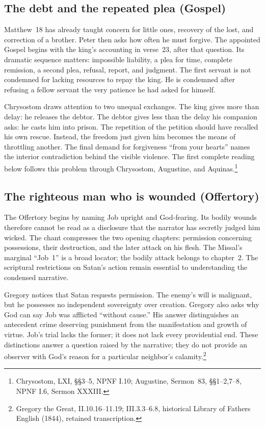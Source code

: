 \subsection{The debt and the repeated plea (Gospel)}
Matthew~18 has already taught concern for little ones, recovery of the
lost, and correction of a brother. Peter then asks how often he must
forgive. The appointed Gospel begins with the king's accounting in
verse~23, after that question. Its dramatic sequence matters: impossible
liability, a plea for time, complete remission, a second plea, refusal,
report, and judgment. The first servant is not condemned for lacking
resources to repay the king. He is condemned after refusing a fellow
servant the very patience he had asked for himself.

Chrysostom draws attention to two unequal exchanges. The king gives more
than delay: he releases the debtor. The debtor gives less than the delay
his companion asks: he casts him into prison. The repetition of the
petition should have recalled his own rescue. Instead, the freedom just
given him becomes the means of throttling another. The final demand for
forgiveness ``from your hearts'' names the interior contradiction behind
the visible violence. The first complete reading below follows this
problem through Chrysostom, Augustine, and Aquinas.\footnote{Chrysostom,
 LXI, \S\S3--5, NPNF I.10; Augustine,
Sermon~83, \S\S1--2,7--8, NPNF I.6, Sermon XXXIII.}

\subsection{The righteous man who is wounded (Offertory)}
The Offertory begins by naming Job upright and God-fearing. Its bodily
wounds therefore cannot be read as a disclosure that the narrator has
secretly judged him wicked. The chant compresses the two opening chapters:
permission concerning possessions, their destruction, and the later
attack on his flesh. The Missal's marginal ``Job~1'' is a broad locator;
the bodily attack belongs to chapter~2. The scriptural restrictions on
Satan's action remain essential to understanding the condensed narrative.

Gregory notices that Satan requests permission. The enemy's will is
malignant, but he possesses no independent sovereignty over creation.
Gregory also asks why God can say Job was afflicted ``without cause.''
His answer distinguishes an antecedent crime deserving punishment from
the manifestation and growth of virtue. Job's trial lacks the former;
it does not lack every providential end. These distinctions answer a
question raised by the narrative; they do not provide an observer with
God's reason for a particular neighbor's calamity.\footnote{Gregory the
Great,  II.10.16--11.19; III.3.3--6.8, historical
Library of Fathers English (1844), retained transcription.}

